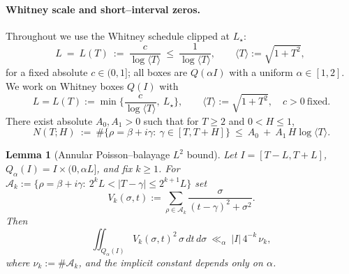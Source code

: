 \documentclass[11pt]{article}
\newtheorem{lemma}[theorem]{Lemma}
\theoremstyle{definition}
\theoremstyle{remark}
\theoremstyle{definition}
\begin{document}
\paragraph{Whitney scale and short–interval zeros.}
Throughout we use the Whitney schedule clipped at $L_\star$:
\[
  L\ =\ L(T)\ :=\ \frac{c}{\log\langle T\rangle}\ \le\ \frac{1}{\log\langle T\rangle},\qquad \langle T\rangle:=\sqrt{1+T^2},\
\]
for a fixed absolute $c\in(0,1]$; all boxes are $Q(\alpha I)$ with a uniform $\alpha\in[1,2]$.
We work on Whitney boxes $Q(I)$ with
\[
  L=L(T):=\min\Big\{\frac{c}{\log\langle T\rangle},\ L_\star\Big\},\qquad \langle T\rangle:=\sqrt{1+T^2},\quad c>0\ \text{fixed}.
\]
There exist absolute $A_0,A_1>0$ such that for $T\ge2$ and $0<H\le1$,
\[
  N(T;H)\ :=\ \#\{\rho=\beta+i\gamma:\ \gamma\in[T,T+H]\}\ \le\ A_0\ +\ A_1\,H\log\langle T\rangle.
\]
\begin{lemma}[Annular Poisson–balayage $L^2$ bound]\label{lem:annular-balayage}
Let $I=[T-L,T+L]$, $Q_\alpha(I)=I\times(0,\alpha L]$, and fix $k\ge1$. For
$\mathcal A_k:=\{\rho=\beta+i\gamma:\ 2^kL<|T-\gamma|\le 2^{k+1}L\}$ set
\[
  V_k(\sigma,t):=\sum_{\rho\in\mathcal A_k}\frac{\sigma}{(t-\gamma)^2+\sigma^2}.
\]
Then
\[
  \iint_{Q_\alpha(I)} V_k(\sigma,t)^2\,\sigma\,dt\,d\sigma\ \ll_\alpha\ |I|\,4^{-k}\,\nu_k,
\]
where $\nu_k:=\#\mathcal A_k$, and the implicit constant depends only on $\alpha$.
\end{lemma}
\end{document}
